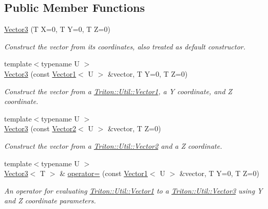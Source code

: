 \subsection*{Public Member Functions}
\begin{DoxyCompactItemize}
\item 
\hyperlink{class_triton_1_1_util_1_1_vector3_a7ff2d48cbf361a1c29dcfa7922cc7f76}{Vector3} (T X=0, T Y=0, T Z=0)
\begin{DoxyCompactList}\small\item\em Construct the vector from its coordinates, also treated as default constructor. \end{DoxyCompactList}\item 
{\footnotesize template$<$typename U $>$ }\\\hyperlink{class_triton_1_1_util_1_1_vector3_a38db25895019ecbfd2f4bfb7af4ea569}{Vector3} (const \hyperlink{class_triton_1_1_util_1_1_vector1}{Vector1}$<$ U $>$ \&vector, T Y=0, T Z=0)
\begin{DoxyCompactList}\small\item\em Construct the vector from a \hyperlink{class_triton_1_1_util_1_1_vector1}{Triton\+::\+Util\+::\+Vector1}, a Y coordinate, and Z coordinate. \end{DoxyCompactList}\item 
{\footnotesize template$<$typename U $>$ }\\\hyperlink{class_triton_1_1_util_1_1_vector3_ad4d789aa3a7b5974230b7c4c6018d1f1}{Vector3} (const \hyperlink{class_triton_1_1_util_1_1_vector2}{Vector2}$<$ U $>$ \&vector, T Z=0)
\begin{DoxyCompactList}\small\item\em Construct the vector from a \hyperlink{class_triton_1_1_util_1_1_vector2}{Triton\+::\+Util\+::\+Vector2} and a Z coordinate. \end{DoxyCompactList}\item 
{\footnotesize template$<$typename U $>$ }\\\hyperlink{class_triton_1_1_util_1_1_vector3}{Vector3}$<$ T $>$ \& \hyperlink{class_triton_1_1_util_1_1_vector3_a73fccfb26f18c94bb62e33de03ecf9c1}{operator=} (const \hyperlink{class_triton_1_1_util_1_1_vector1}{Vector1}$<$ U $>$ \&vector, T Y=0, T Z=0)
\begin{DoxyCompactList}\small\item\em An operator for evaluating \hyperlink{class_triton_1_1_util_1_1_vector1}{Triton\+::\+Util\+::\+Vector1} to a \hyperlink{class_triton_1_1_util_1_1_vector3}{Triton\+::\+Util\+::\+Vector3} using Y and Z coordinate parameters. \end{DoxyCompactList}\item 

\end{DoxyCompactItemize}
